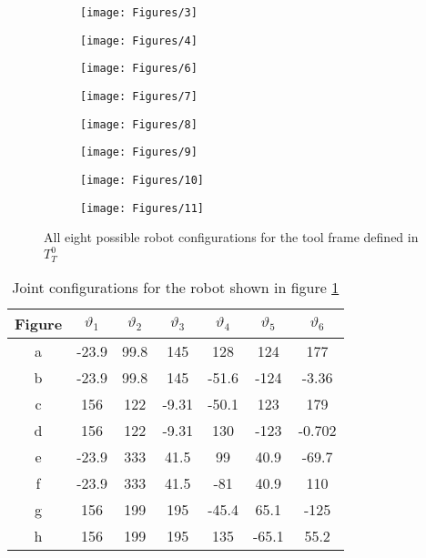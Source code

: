 \documentclass[conference]{IEEEtran}
\begin{document}
\begin{figure}
	\centering
	\begin{subfigure}[b]{0.2\textwidth}
		\centering
		\texttt{[image: Figures/3]}
		\caption{}
	\end{subfigure}
	\begin{subfigure}[b]{0.2\textwidth}
		\centering
		\texttt{[image: Figures/4]}
		\caption{}
	\end{subfigure}
	\newline
	\begin{subfigure}[b]{0.2\textwidth}
		\centering
		\texttt{[image: Figures/6]}
		\caption{}
	\end{subfigure}
	\begin{subfigure}[b]{0.2\textwidth}
		\centering
		\texttt{[image: Figures/7]}
		\caption{}
	\end{subfigure}
	\newline
	\begin{subfigure}[b]{0.2\textwidth}
		\centering
		\texttt{[image: Figures/8]}
		\caption{}
	\end{subfigure}
	\begin{subfigure}[b]{0.2\textwidth}
		\centering
		\texttt{[image: Figures/9]}
		\caption{}
	\end{subfigure}
	\newline
	\begin{subfigure}[b]{0.2\textwidth}
		\centering
		\texttt{[image: Figures/10]}
		\caption{}
	\end{subfigure}
	\begin{subfigure}[b]{0.2\textwidth}
		\centering
		\texttt{[image: Figures/11]}
		\caption{}
	\end{subfigure}
	\caption{All eight possible robot configurations for the tool frame defined in $T_T^0$}
	\label{fig:RobotConfigs}
\end{figure}

\begin{table}[]
	\centering
	\begin{tabular}{@{}ccccccc@{}}
		\toprule
		Figure & $\vartheta_1$ & $\vartheta_2$ & $\vartheta_3$ & $\vartheta_4$ & $\vartheta_5$ & $\vartheta_6$ \\ \midrule
		a & -23.9 & 99.8 & 145 & 128 & 124 & 177 \\
		b & -23.9 & 99.8 & 145 & -51.6 & -124 & -3.36 \\
		c & 156 & 122 & -9.31 & -50.1 & 123 & 179 \\
		d & 156 & 122 & -9.31 & 130 & -123 & -0.702 \\
		e & -23.9 & 333 & 41.5 & 99 & 40.9 & -69.7 \\
		f & -23.9 & 333 & 41.5 & -81 & 40.9 & 110 \\
		g & 156 & 199 & 195 & -45.4 & 65.1 & -125 \\
		h & 156 & 199 & 195 & 135 & -65.1 & 55.2 \\ \bottomrule
	\end{tabular}
	\caption{Joint configurations for the robot shown in figure \ref{fig:RobotConfigs}}
	\label{tab:jointConfigs}
\end{table}
\end{document}
